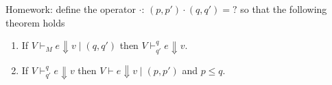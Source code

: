 \documentclass[ manuscript, review,screen, nonacm]{acmart}
\begin{document}
Homework: define the operator $\cdot$: $(p,p') \cdot (q,q') = ?$ so that the following theorem holds

\begin{theorem}
\begin{enumerate}
    \item If $V\vdash_M e \Downarrow v \mid (q, q')$ then $V\vdash_{q'}^q e \Downarrow v $.
    \item If $V\vdash_{q'}^q e \Downarrow v$ then $V \vdash e \Downarrow v \mid (p, p')$ and $p\leq q$.
\end{enumerate}
  
\end{theorem}
\end{document}
